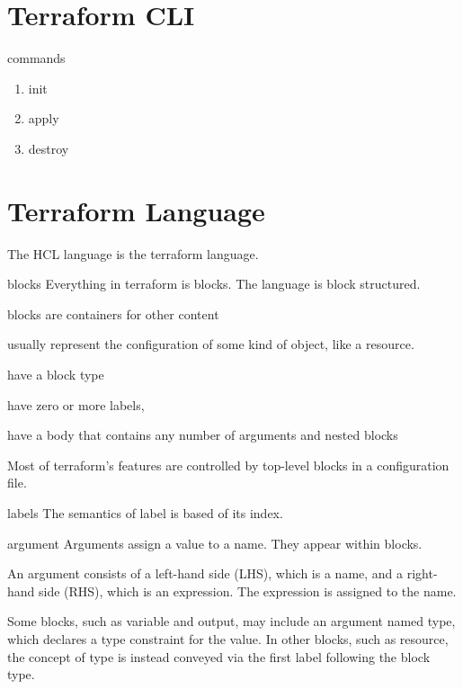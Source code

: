 \documentclass[openany, 12pt]{book}
\begin{document}
\chapter{Terraform CLI}

\begin{definition}{commands}{}
	\begin{enumerate}[label = {(\arabic*)}]
		\item init
		\item apply
		\item destroy
	\end{enumerate}
\end{definition}

\chapter{Terraform Language}
The HCL language is the terraform language.

\begin{definition}{blocks}{}
	Everything in terraform is blocks. The language is block structured.

	\begin{alist}
		\item blocks are containers for other content
		\item usually represent the configuration of some kind of object, like a
		resource.
		\item have a block type
		\item have zero or more labels,
		\item have a body that contains any number of arguments and nested blocks
	\end{alist}
	Most of terraform's features are controlled by top-level blocks in a
	configuration file.

\end{definition}

\begin{definition}{labels}{}
	The semantics of label is based of its index.
\end{definition}

\begin{definition}{argument}{}
	Arguments assign a value to a name. They appear within blocks.

	An argument consists of a left-hand side (LHS), which is a name, and a
	right-hand side (RHS), which is an expression. The expression is assigned to
	the name.

	Some blocks, such as variable and output, may include an argument named
	type, which declares a type constraint for the value. In other blocks, such
	as resource, the concept of type is instead conveyed via the first label
	following the block type.
\end{definition}
\end{document}
